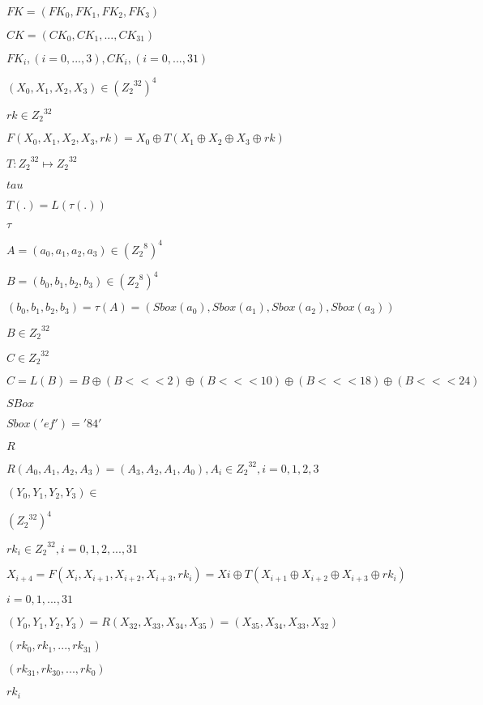 \documentclass{article}
\begin{document}
$ FK = (FK_0, FK_1, FK_2, FK_3)$
\pagebreak

$ CK = (CK_0,CK_1,...,CK_{31})$
\pagebreak

$ FK_i, (i = 0,...,3), CK_i, (i = 0,...,31)$
\pagebreak

$(X_0,X_1,X_2,X_3) \in {({Z_2}^{32})}^{4}$
\pagebreak

$rk \in {Z_2}^{32}$
\pagebreak

$ F(X_0,X_1,X_2,X_3,rk) = X_0 \oplus T(X_1 \oplus X_2 \oplus X_3 \oplus rk)$
\pagebreak

$T : {Z_2}^{32} \mapsto {Z_2}^{32}$
\pagebreak

$tau$
\pagebreak

$T(.) = L(\tau(.))$
\pagebreak

$\tau$
\pagebreak

$A = (a_0, a_1, a_2, a_3) \in {({Z_2}^{8})}^{4}$
\pagebreak

$B = (b_0, b_1, b_2, b_3) \in {({Z_2}^{8})}^{4}$
\pagebreak

$(b_0, b_1, b_2, b_3) = \tau(A) = (Sbox(a_0), Sbox(a_1), Sbox(a_2), Sbox(a_3))$
\pagebreak

$B \in {Z_2}^{32}$
\pagebreak

$C \in {Z_2}^{32}$
\pagebreak

$C = L(B) = B \oplus (B <<< 2) \oplus (B <<< 10) \oplus (B <<< 18) \oplus (B <<< 24)$
\pagebreak

$ S Box$
\pagebreak

$ Sbox('ef')='84'$
\pagebreak

$ R$
\pagebreak

$R(A_0,A_1,A_2,A_3) = (A_3,A_2,A_1,A_0),A_i \in {Z_2}^{32}, i = 0,1,2,3$
\pagebreak

$(Y_0,Y_1,Y_2,Y_3) \in $
\pagebreak

${({Z_2}^{32})}^{4}$
\pagebreak

$rk_i \in {Z_2}^{32}, i = 0,1,2,...,31$
\pagebreak

$ X_{i+4} = F(X_i,X_{i+1},X_{i+2},X_{i+3}, rk_i) = Xi \oplus T(X_{i+1} \oplus X_{i+2} \oplus X_{i+3} \oplus rk_i)$
\pagebreak

$ i = 0,1,...,31$
\pagebreak

$(Y_0, Y_1, Y_2, Y_3) = R(X_{32},X_{33},X_{34},X_{35}) = (X_{35},X_{34},X_{33},X_{32})$
\pagebreak

$(rk_0, rk_1,...,rk_{31})$
\pagebreak

$(rk_{31}, rk_{30},...,rk_0)$
\pagebreak

$rk_i$
\pagebreak
\end{document}

